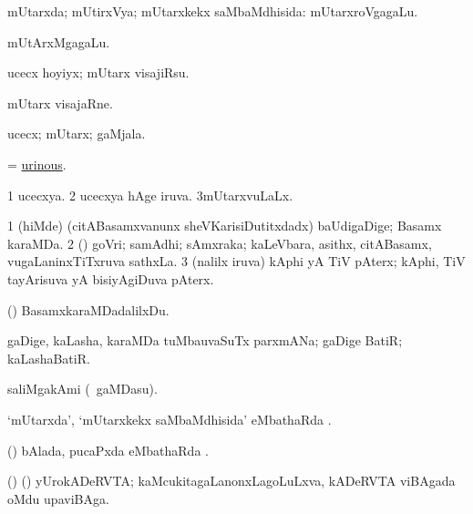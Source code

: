 \bentry
{} 
\gl{\gu}
\expl{}
\bmng
mUtarxda; mUtirxVya; mUtarxkekx saMbaMdhisida:  mUtarxroVgagaLu. 
\emng

\noindent 
\gl{\pagu}
\expl{}
\bmng
{} mUtArxMgagaLu. 
\emng
\eentry

\bentry
{} 
\gl{\akirx}
\expl{}
\bmng
ucecx hoyiyx; mUtarx visajiRsu. 
\emng
\eentry

\bentry
{} 
\gl{\nA}
\expl{}
\bmng
mUtarx visajaRne. 
\emng
\eentry

\bentry
{} 
\gl{\nA}
\expl{}
\bmng
ucecx; mUtarx; gaMjala. 
\emng
\eentry

\bentry
{} 
\gl{\gu}
\expl{}
\bmng
= \hyperlink{urinous}{urinous}. 
\emng
\eentry

\bentry
{} 
\gl{\gu}
\expl{}
\bmng
\bnum
\num{1} ucecxya. 
\num{2} ucecxya hAge iruva. 
\num{3}mUtarxvuLaLx. 
\enum
\emng
\eentry

{} 
\gl{\nA}
\expl{}
\bmng
\bnum
\num{1} (hiMde) (citABasamxvanunx sheVKarisiDutitxdadx) baUdigaDige; Basamx karaMDa.  
\num{2} (\kAparx) goVri; samAdhi; sAmxraka; kaLeVbara, asithx, citABasamx, \mo vugaLaninxTiTxruva sathxLa. 
\num{3} (nalilx iruva) kAphi yA TiV pAterx; kAphi, TiV tayArisuva yA bisiyAgiDuva pAterx. 
\enum
\emng
\eentry

\bentry
{} 
\gl{\sakirx}
\expl{}
\bmng
(\pArxparx) BasamxkaraMDadalilxDu. 
\emng
\eentry

\bentry
{} 
\gl{\nA}
\bmng
gaDige, kaLasha, karaMDa tuMbauvaSuTx parxmANa; gaDige BatiR; kaLashaBatiR. 
\emng
\eentry

\bentry
{} 
\gl{\nA}
\expl{}
\bmng
saliMgakAmi (\sA\ gaMDasu). 
\emng
\eentry

\bentry
{} 
\gl{\sapUpa}
\expl{}
\bmng
`mUtarxda', `mUtarxkekx saMbaMdhisida' eMbathaRda \sapUpa. 
\emng
\eentry

\bentry
{} 
\gl{\sapUpa}
\expl{}
\bmng
(\pArxvi) bAlada, pucaPxda eMbathaRda \sapUpa. 
\emng
\eentry

\bentry
{} 
\gl{\nA}
\expl{}
\bmng
(\bava) (\pArxvi) yUrokADeRVTA; kaMcukitagaLanonxLagoLuLxva, kADeRVTA viBAgada oMdu upaviBAga. 
\emng
\eentry

